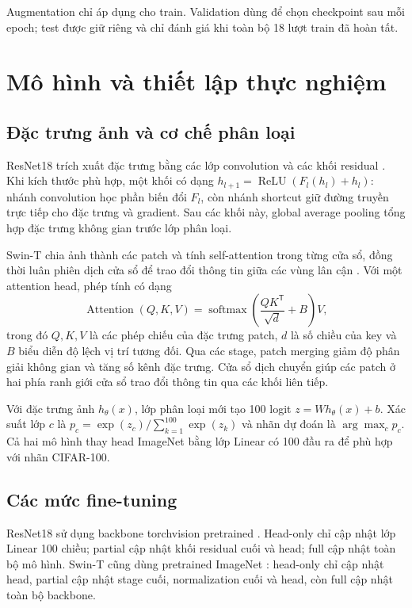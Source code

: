 \documentclass[12pt,a4paper]{report}
\begin{document}
Augmentation chỉ áp dụng cho train. Validation dùng để chọn checkpoint sau mỗi epoch; test được giữ riêng và chỉ đánh giá khi toàn bộ 18 lượt train đã hoàn tất.

\chapter{Mô hình và thiết lập thực nghiệm}
\section{Đặc trưng ảnh và cơ chế phân loại}
ResNet18 trích xuất đặc trưng bằng các lớp convolution và các khối residual \cite{resnet}. Khi kích thước phù hợp, một khối có dạng $h_{l+1}=\operatorname{ReLU}(F_l(h_l)+h_l)$: nhánh convolution học phần biến đổi $F_l$, còn nhánh shortcut giữ đường truyền trực tiếp cho đặc trưng và gradient. Sau các khối này, global average pooling tổng hợp đặc trưng không gian trước lớp phân loại.

Swin-T chia ảnh thành các patch và tính self-attention trong từng cửa sổ, đồng thời luân phiên dịch cửa sổ để trao đổi thông tin giữa các vùng lân cận \cite{swin}. Với một attention head, phép tính có dạng
\[
\operatorname{Attention}(Q,K,V)=\operatorname{softmax}\!\left(\frac{QK^{\mathsf T}}{\sqrt{d}}+B\right)V,
\]
trong đó $Q,K,V$ là các phép chiếu của đặc trưng patch, $d$ là số chiều của key và $B$ biểu diễn độ lệch vị trí tương đối. Qua các stage, patch merging giảm độ phân giải không gian và tăng số kênh đặc trưng. Cửa sổ dịch chuyển giúp các patch ở hai phía ranh giới cửa sổ trao đổi thông tin qua các khối liên tiếp.

Với đặc trưng ảnh $h_\theta(x)$, lớp phân loại mới tạo 100 logit $z=Wh_\theta(x)+b$. Xác suất lớp $c$ là $p_c=\exp(z_c)/\sum_{k=1}^{100}\exp(z_k)$ và nhãn dự đoán là $\arg\max_c p_c$. Cả hai mô hình thay head ImageNet bằng lớp Linear có 100 đầu ra để phù hợp với nhãn CIFAR-100.

\section{Các mức fine-tuning}
ResNet18 sử dụng backbone torchvision pretrained \cite{resnet,torchvision}. Head-only chỉ cập nhật lớp Linear 100 chiều; partial cập nhật khối residual cuối và head; full cập nhật toàn bộ mô hình. Swin-T cũng dùng pretrained ImageNet \cite{swin,torchvision}: head-only chỉ cập nhật head, partial cập nhật stage cuối, normalization cuối và head, còn full cập nhật toàn bộ backbone.
\end{document}
